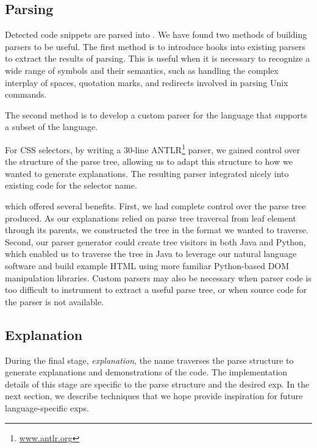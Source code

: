 \subsection{Parsing}
Detected code snippets are parsed into .
We have found two methods of building parsers to be useful. The first method is to introduce hooks into existing parsers to extract the results of parsing.  This is useful 
when it is necessary to recognize a wide range of symbols and their semantics, %
such as handling the complex interplay of spaces, quotation marks, and redirects involved in parsing Unix commands.

The second method is to develop a custom parser for the language that supports a subset of the language.
\begin{changes}
For CSS selectors, by writing a 30-line ANTLR\footnote{\url{www.antlr.org}} parser, we gained control over the structure of the parse tree, allowing us to adapt this structure to how we wanted to generate explanations.
The resulting parser integrated nicely into existing code for the selector \Gls{name}.
\end{changes}
which offered several benefits.
First, we had complete control over the parse tree produced.
As our explanations relied on parse tree traversal from leaf element through its parents, we constructed the tree in the format we wanted to traverse.
Second, our parser generator could create tree visitors in both Java and Python, which enabled us to traverse the tree in Java to leverage our natural language software and build example HTML using more familiar Python-based DOM manipulation libraries.
Custom parsers may also be necessary when parser code is too difficult to instrument to extract a useful parse tree, or when source code for the parser is not available.
\fi

\subsection{Explanation}

During the final stage, \emph{explanation}, the \Gls{name} traverses the parse structure to generate explanations and demonstrations of the code.
The implementation details of this stage are specific to the parse structure and the desired \gls{exp}.
In the next section, we describe techniques that we hope provide inspiration for future language-specific \glspl{exp}.
